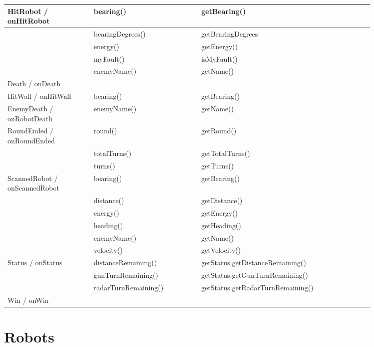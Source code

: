 \begin{center}
	\begin{tabular}{ | p{0.2\linewidth} | p{0.25\linewidth} | p{0.4\linewidth} |}
		\hline
		HitRobot / onHitRobot & bearing() & getBearing() \\ \hline
		& bearingDegrees() & getBearingDegrees \\ \hline
		& energy() & getEnergy() \\ \hline
		& myFault() & isMyFault() \\ \hline
		& enemyName() & getName() \\ \hline
		Death / onDeath & & \\ \hline
		HitWall / onHitWall & bearing() & getBearing() \\ \hline
		EnemyDeath / onRobotDeath & enemyName() & getName() \\ \hline
		RoundEnded / onRoundEnded & round() & getRound() \\ \hline
		& totalTurns() & getTotalTurns() \\ \hline
		& turns() & getTurns() \\ \hline
		ScannedRobot / onScannedRobot & bearing() & getBearing() \\ \hline
		& distance() & getDistance() \\ \hline
		& energy() & getEnergy() \\ \hline
		& heading() & getHeading() \\ \hline
		& enemyName() & getName() \\ \hline
		& velocity() & getVelocity() \\ \hline
		Status / onStatus & distanceRemaining() & getStatus.getDistanceRemaining() \\ \hline
		& gunTurnRemaining() & getStatus.getGunTurnRemaining() \\ \hline
		& radarTurnRemaining() & getStatus.getRadarTurnRemaining() \\ \hline
		Win / onWin &  & \\
		\hline
	\end{tabular}
		\label{fig:EventTable}
\end{center}

\section{Robots}
